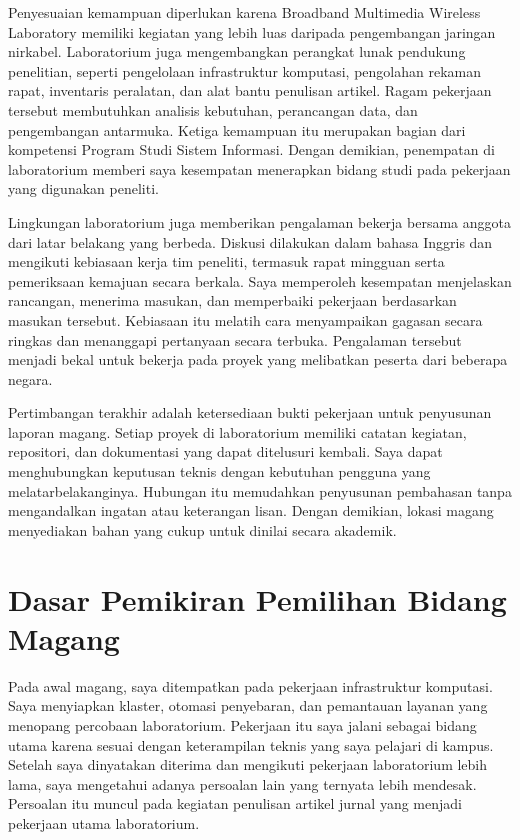 Penyesuaian kemampuan diperlukan karena Broadband Multimedia Wireless
Laboratory memiliki kegiatan yang lebih luas daripada pengembangan jaringan
nirkabel. Laboratorium juga mengembangkan perangkat lunak pendukung penelitian,
seperti pengelolaan infrastruktur komputasi, pengolahan rekaman rapat,
inventaris peralatan, dan alat bantu penulisan artikel. Ragam pekerjaan
tersebut membutuhkan analisis kebutuhan, perancangan data, dan pengembangan
antarmuka. Ketiga kemampuan itu merupakan bagian dari kompetensi Program Studi
Sistem Informasi. Dengan demikian, penempatan di laboratorium memberi saya
kesempatan menerapkan bidang studi pada pekerjaan yang digunakan peneliti.

Lingkungan laboratorium juga memberikan pengalaman bekerja bersama anggota dari
latar belakang yang berbeda. Diskusi dilakukan dalam bahasa Inggris dan
mengikuti kebiasaan kerja tim peneliti, termasuk rapat mingguan serta
pemeriksaan kemajuan secara berkala. Saya memperoleh kesempatan menjelaskan
rancangan, menerima masukan, dan memperbaiki pekerjaan berdasarkan masukan
tersebut. Kebiasaan itu melatih cara menyampaikan gagasan secara ringkas dan
menanggapi pertanyaan secara terbuka. Pengalaman tersebut menjadi bekal untuk
bekerja pada proyek yang melibatkan peserta dari beberapa negara.

Pertimbangan terakhir adalah ketersediaan bukti pekerjaan untuk penyusunan
laporan magang. Setiap proyek di laboratorium memiliki catatan kegiatan,
repositori, dan dokumentasi yang dapat ditelusuri kembali. Saya dapat
menghubungkan keputusan teknis dengan kebutuhan pengguna yang
melatarbelakanginya. Hubungan itu memudahkan penyusunan pembahasan tanpa
mengandalkan ingatan atau keterangan lisan. Dengan demikian, lokasi magang
menyediakan bahan yang cukup untuk dinilai secara akademik.

\section{Dasar Pemikiran Pemilihan Bidang Magang}

Pada awal magang, saya ditempatkan pada pekerjaan infrastruktur komputasi. Saya
menyiapkan klaster, otomasi penyebaran, dan pemantauan layanan yang menopang
percobaan laboratorium. Pekerjaan itu saya jalani sebagai bidang utama karena
sesuai dengan keterampilan teknis yang saya pelajari di kampus. Setelah saya
dinyatakan diterima dan mengikuti pekerjaan laboratorium lebih lama, saya
mengetahui adanya persoalan lain yang ternyata lebih mendesak. Persoalan itu
muncul pada kegiatan penulisan artikel jurnal yang menjadi pekerjaan utama
laboratorium.

